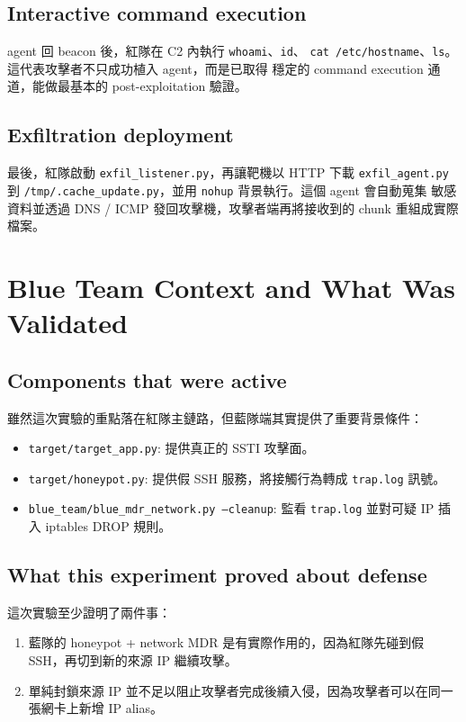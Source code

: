 \documentclass[UTF8,11pt]{ctexart}
\begin{document}
\subsection{Interactive command execution}
agent 回 beacon 後，紅隊在 C2 內執行 \texttt{whoami}、\texttt{id}、
\texttt{cat /etc/hostname}、\texttt{ls}。這代表攻擊者不只成功植入 agent，而是已取得
穩定的 command execution 通道，能做最基本的 post-exploitation 驗證。

\subsection{Exfiltration deployment}
最後，紅隊啟動 \texttt{exfil\_listener.py}，再讓靶機以 HTTP 下載 \texttt{exfil\_agent.py}
到 \texttt{/tmp/.cache\_update.py}，並用 \texttt{nohup} 背景執行。這個 agent 會自動蒐集
敏感資料並透過 DNS / ICMP 發回攻擊機，攻擊者端再將接收到的 chunk 重組成實際檔案。

\section{Blue Team Context and What Was Validated}

\subsection{Components that were active}
雖然這次實驗的重點落在紅隊主鏈路，但藍隊端其實提供了重要背景條件：
\begin{itemize}[leftmargin=*]
  \item \texttt{target/target\_app.py}: 提供真正的 SSTI 攻擊面。
  \item \texttt{target/honeypot.py}: 提供假 SSH 服務，將接觸行為轉成 \texttt{trap.log} 訊號。
  \item \texttt{blue\_team/blue\_mdr\_network.py --cleanup}: 監看 \texttt{trap.log} 並對可疑 IP 插入 iptables DROP 規則。
\end{itemize}

\subsection{What this experiment proved about defense}
這次實驗至少證明了兩件事：
\begin{enumerate}[leftmargin=*]
  \item 藍隊的 honeypot + network MDR 是有實際作用的，因為紅隊先碰到假 SSH，再切到新的來源 IP 繼續攻擊。
  \item 單純封鎖來源 IP 並不足以阻止攻擊者完成後續入侵，因為攻擊者可以在同一張網卡上新增 IP alias。
\end{enumerate}
\end{document}
